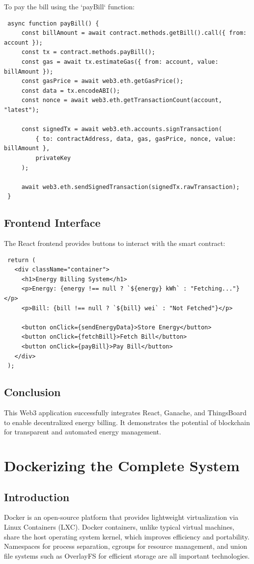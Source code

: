 \documentclass[a4paper,12pt]{report}
\begin{document}
 To pay the bill using the `payBill` function:
 
 \begin{lstlisting}
 async function payBill() {
     const billAmount = await contract.methods.getBill().call({ from: account });
     const tx = contract.methods.payBill();
     const gas = await tx.estimateGas({ from: account, value: billAmount });
     const gasPrice = await web3.eth.getGasPrice();
     const data = tx.encodeABI();
     const nonce = await web3.eth.getTransactionCount(account, "latest");
 
     const signedTx = await web3.eth.accounts.signTransaction(
         { to: contractAddress, data, gas, gasPrice, nonce, value: billAmount },
         privateKey
     );
 
     await web3.eth.sendSignedTransaction(signedTx.rawTransaction);
 }
 \end{lstlisting}
 
 \section{Frontend Interface}
 The React frontend provides buttons to interact with the smart contract:
 
 \begin{lstlisting}
 return (
   <div className="container">
     <h1>Energy Billing System</h1>
     <p>Energy: {energy !== null ? `${energy} kWh` : "Fetching..."}</p>
     <p>Bill: {bill !== null ? `${bill} wei` : "Not Fetched"}</p>
     
     <button onClick={sendEnergyData}>Store Energy</button>
     <button onClick={fetchBill}>Fetch Bill</button>
     <button onClick={payBill}>Pay Bill</button>
   </div>
 );
 \end{lstlisting}
 
 \section{Conclusion}
 This Web3 application successfully integrates React, Ganache, and ThingsBoard to enable decentralized energy billing. It demonstrates the potential of blockchain for transparent and automated energy management.

\chapter{Dockerizing the Complete System}
\section{Introduction}
Docker is an open-source platform that provides lightweight virtualization via Linux Containers (LXC). Docker containers, unlike typical virtual machines, share the host operating system kernel, which improves efficiency and portability. Namespaces for process separation, cgroups for resource management, and union file systems such as OverlayFS for efficient storage are all important technologies.
\end{document}
